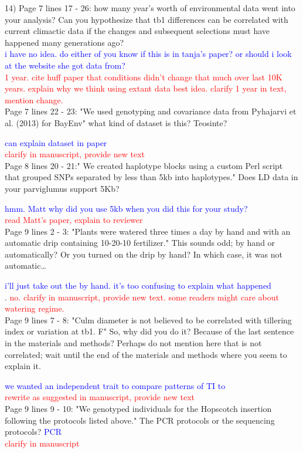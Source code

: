 \documentclass[11pt]{article}
\newcommand{\res}[1]{\noindent \textcolor{blue}{{#1}} \\}
\newcommand{\jri}[1]{\noindent \textcolor{red}{{#1}} \\}
\begin{document}
14) Page 7 lines 17 - 26: how many year's worth of environmental data went into your analysis? Can you hypothesize that tb1 differences can be correlated with current climactic data if the changes and subsequent selections must have happened many generations ago?\\
 
\res{i have no idea. do either of you know if this is in tanja's paper? or should i look at the website she got data from?}
\jri{1 year. cite huff paper that conditions didn't change that much over last 10K years. explain why we think using extant data best idea. clarify 1 year in text, mention change.}

Page 7 lines 22 - 23: "We used genotyping and covariance data from Pyhajarvi et al. (2013) for BayEnv" what kind of dataset is this? Teosinte? 

\res{can explain dataset in paper}
\jri{clarify in manuscript, provide new text}

Page 8 lines 20 - 21:" We created haplotype blocks using a custom Perl script that grouped SNPs separated by less than 5kb into haplotypes." Does LD data in your parviglumus support 5Kb? 

\res{hmm. Matt why did you use 5kb when you did this for your study?}
\jri{read Matt's paper, explain to reviewer}

Page 9 lines 2 - 3: "Plants were watered three times a day by hand and with an automatic drip containing 10-20-10 fertilizer." This sounds odd; by hand or automatically? Or you turned on the drip by hand? In which case, it was not automatic… 

\res{i'll just take out the by hand. it's too confusing to explain what happened}. 
\jri{no. clarify in manuscript, provide new text. some readers might care about watering regime.}

Page 9 lines 7 - 8: "Culm diameter is not believed to be correlated with tillering index or variation at tb1. F" So, why did you do it? Because of the last sentence in the materials and methods? Perhaps do not mention here that is not correlated; wait until the end of the materials and methods where you seem to explain it. 

\res{we wanted an independent trait to compare patterns of TI to}
\jri{rewrite as suggested in manuscript, provide new text}

Page 9 lines 9 - 10: "We genotyped individuals for the Hopscotch insertion following the protocols listed above." The PCR protocols or the sequencing protocols? \res{PCR}
\jri{clarify in manuscript}
\end{document}
